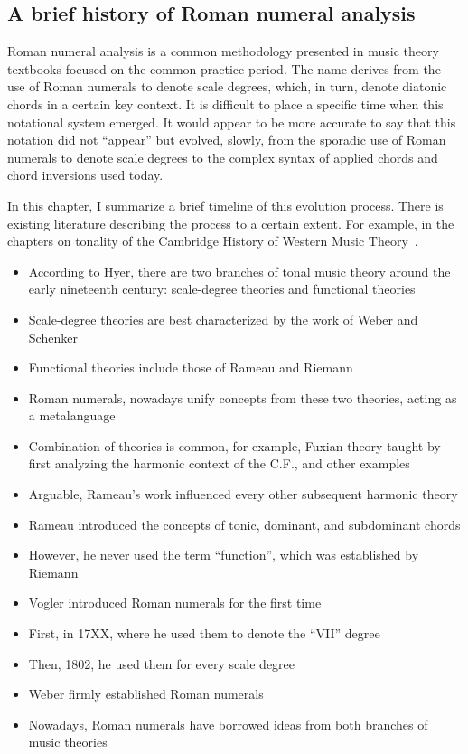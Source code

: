 \subsection{A brief history of Roman numeral analysis}
\label{sec:a_brief_history_of_roman_numeral_analysis}

Roman numeral analysis is a common methodology presented in music theory textbooks focused on the common practice period.
The name derives from the use of Roman numerals to denote scale degrees, which, in turn, denote diatonic chords in a certain key context.
It is difficult to place a specific time when this notational system emerged.
It would appear to be more accurate to say that this notation did not ``appear'' but evolved, slowly, from the sporadic use of Roman numerals to denote scale degrees to the complex syntax of applied chords and chord inversions used today.

In this chapter, I summarize a brief timeline of this evolution process.
There is existing literature describing the process to a certain extent.
For example, in the chapters on tonality of the Cambridge History of Western Music Theory~\parencite{christensen_2002}.

\begin{itemize}
    \item According to Hyer, there are two branches of tonal music theory around the early nineteenth century: scale-degree theories and functional theories
    \item Scale-degree theories are best characterized by the work of Weber and Schenker
    \item Functional theories include those of Rameau and Riemann
    \item Roman numerals, nowadays unify concepts from these two theories, acting as a metalanguage
    \item Combination of theories is common, for example, Fuxian theory taught by first analyzing the harmonic context of the C.F., and other examples
    \item Arguable, Rameau's work influenced every other subsequent harmonic theory
    \item Rameau introduced the concepts of tonic, dominant, and subdominant chords
    \item However, he never used the term ``function'', which was established by Riemann
    \item Vogler introduced Roman numerals for the first time
    \item First, in 17XX, where he used them to denote the ``VII'' degree
    \item Then, 1802, he used them for every scale degree
    \item Weber firmly established Roman numerals
    \item Nowadays, Roman numerals have borrowed ideas from both branches of music theories
\end{itemize}



